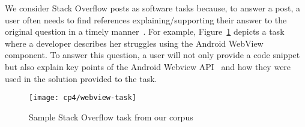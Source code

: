We consider Stack Overflow posts as software tasks because, to answer a post,
a user often needs to find references
explaining/supporting their answer to the original question in a timely manner~\cite{yazdaninia2021}.
For example, Figure~\ref{fig:webview-task} depicts a task where a developer 
describes her struggles using the Android WebView component.
To answer this question, a user will not only provide a code snippet but 
also explain key points of the Android Webview API~\cite{apiWebView}
and how they were used in the solution provided to the task.

\begin{figure}
    \centering
    \texttt{[image: cp4/webview-task]}
    \caption{Sample Stack Overflow task from our corpus}
    \label{fig:webview-task}
\end{figure}